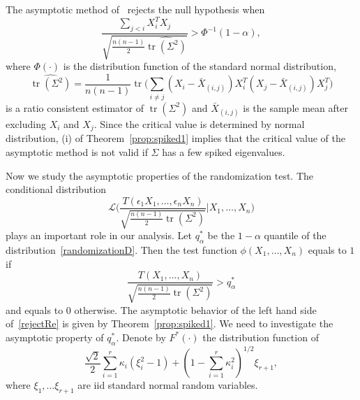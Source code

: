 \documentclass[3p]{elsarticle}
\DeclareMathOperator{\mytr}{tr}
\theoremstyle{plain}
\theoremstyle{definition}
\theoremstyle{remark}
\begin{document}
The asymptotic method of~\citet{Chen2010A} rejects the null hypothesis when
\begin{equation*}
    \frac{\sum_{j< i}X_i^T X_j}{\sqrt{\frac{n(n-1)}{2}\widehat{\mytr(\Sigma^2)}}}>\Phi^{-1}(1-\alpha),
\end{equation*}
where $\Phi(\cdot)$ is the distribution function of the standard normal distribution,
 \begin{equation*}
 \widehat{\mytr(\Sigma^2)}=\frac{1}{n(n-1)}\mytr\Big(\sum_{i\neq j}(X_i-\bar{X}_{(i,j)})X_i^T (X_j-\bar{X}_{(i,j)})X_j^T\Big)
 \end{equation*}
is a ratio consistent estimator of $\mytr(\Sigma^2)$ and $\bar{X}_{(i,j)}$ is the sample mean after excluding $X_i$ and $X_j$.
Since the critical value is determined by normal distribution, (i) of Theorem~\ref{prop:spiked1} implies that the critical value of the asymptotic method is not valid if $\Sigma$ has a few spiked eigenvalues.



Now we study the asymptotic properties of the randomization test.
The conditional distribution
        \begin{equation}\label{randomizationD}
            \mathcal{L}\Bigg(\frac{T(\epsilon_1 X_1,\ldots,\epsilon_n X_n)}{\sqrt{\frac{n(n-1)}{2}\mytr(\Sigma^2)}}\bigg|X_1,\ldots,X_n\Bigg)
        \end{equation}
 plays an important role in our analysis.
Let $q_{\alpha}^*$ be the $1-\alpha$ quantile of the distribution~\eqref{randomizationD}.
Then the test function $\phi(X_1,\ldots,X_n)$ equals to $1$ if
\begin{equation}\label{rejectRe}
\frac{T(X_1,\ldots, X_n)}{\sqrt{\frac{n(n-1)}{2}\mytr(\Sigma^2)}}> q^*_{\alpha}
\end{equation}
and equals to $0$ otherwise.
The asymptotic behavior of the left hand side of~\eqref{rejectRe} is given by Theorem~\ref{prop:spiked1}.
We need to investigate the asymptotic property of $q^*_{\alpha}$.
Denote by $F^*(\cdot)$ the distribution function of
            $$
            \frac{\sqrt{2}}{2}\sum_{i=1}^r \kappa_i (\xi_i^2-1)+(1-\sum_{i=1}^r \kappa_i^2)^{1/2} \xi_{r+1},
            $$
             where $\xi_1,\ldots \xi_{r+1}$ are iid standard normal random variables.
\end{document}
